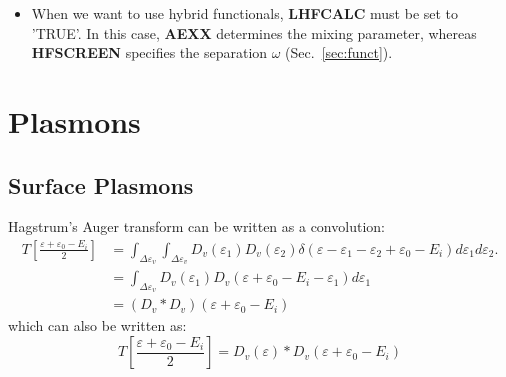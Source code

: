 \begin{refsection}
\begin{itemize}
\item When we want to use hybrid functionals, \textbf{LHFCALC} must be set to 
'TRUE'. In this case, \textbf{AEXX} determines the mixing parameter, whereas 
\textbf{HFSCREEN} specifies the separation $\omega$ (Sec.~\ref{sec:funct}).  
 
\end{itemize} 
 
\chapter{Plasmons} \label{sec:appendix-plasmon} 
 
\section{Surface Plasmons} 
 
Hagstrum's Auger transform can be written as a convolution: 
\begin{equation} 
\begin{aligned} 
T\left[\frac{\varepsilon + \varepsilon_0 - E_i}{2}\right] &= 
\int_{\Delta\varepsilon_v}\int_{\Delta\varepsilon_v} D_v (\varepsilon_1) D_v 
(\varepsilon_2) \delta(\varepsilon - \varepsilon_1 - \varepsilon_2 + 
\varepsilon_0 - E_i) d\varepsilon_1 d\varepsilon_2. \\ 
&= \int_{\Delta\varepsilon_v} D_v (\varepsilon_1) D_v (\varepsilon + 
\varepsilon_0 - E_i - \varepsilon_1) d\varepsilon_1 \\  
&= (D_v * D_v) (\varepsilon + \varepsilon_0 - E_i) 
\end{aligned} 
\end{equation} 
which can also be written as: 
\begin{equation} 
T\left[\frac{\varepsilon + \varepsilon_0 - E_i}{2}\right] = D_v(\varepsilon) * 
D_v(\varepsilon + \varepsilon_0 - E_i) 
\end{equation} 
 

\end{refsection}
